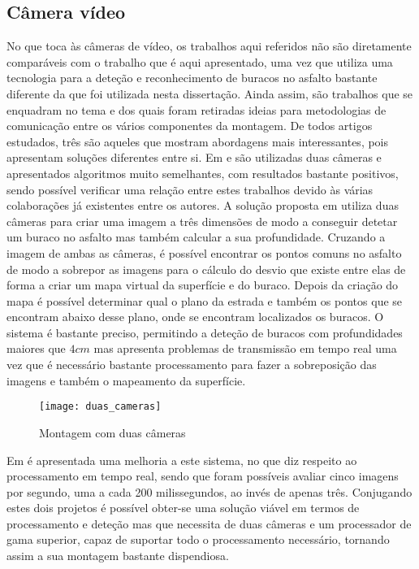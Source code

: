 \subsection{Câmera vídeo}
\label{subsec: camera_video}
No que toca às câmeras de vídeo, os trabalhos aqui referidos não são diretamente comparáveis com o trabalho que é aqui apresentado, uma vez que utiliza uma tecnologia para a deteção e reconhecimento de buracos no asfalto bastante diferente da que foi utilizada nesta dissertação.
Ainda assim, são trabalhos que se enquadram no tema e dos quais foram retiradas ideias para metodologias de comunicação entre os vários componentes da montagem.
De todos artigos estudados, três são aqueles que mostram abordagens mais interessantes, pois apresentam soluções diferentes entre si.
Em \cite{Zhang} e \cite{Chan2014} são utilizadas duas câmeras e apresentados algoritmos muito semelhantes, com resultados bastante positivos, sendo possível verificar uma relação entre estes trabalhos devido às várias colaborações já existentes entre os autores.
A solução proposta em \cite{Zhang} utiliza duas câmeras para criar uma imagem a três dimensões de modo a conseguir detetar um buraco no asfalto mas também calcular a sua profundidade.
Cruzando a imagem de ambas as câmeras, é possível encontrar os pontos comuns no asfalto de modo a sobrepor as imagens para o cálculo do desvio que existe entre elas de forma a criar um mapa virtual da superfície e do buraco.
Depois da criação do mapa é possível determinar qual o plano da estrada e também os pontos que se encontram abaixo desse plano, onde se encontram localizados os buracos.
O sistema é bastante preciso, permitindo a deteção de buracos com profundidades maiores que $4 cm$ mas apresenta problemas de transmissão em tempo real uma vez que é necessário bastante processamento para fazer a sobreposição das imagens e também o mapeamento da superfície.

\begin{figure}[htbp]
	\centering
	\texttt{[image: duas\_cameras]}
	\caption[Montagem com duas câmeras]{Montagem com duas câmeras \footnotemark}
	\label{fig:montagem_com_duas_cameras}
\end{figure}


Em \cite{Chan2014} é apresentada uma melhoria a este sistema, no que diz respeito ao processamento em tempo real, sendo que foram possíveis avaliar cinco imagens por segundo, uma a cada 200 milissegundos, ao invés de apenas três.
Conjugando estes dois projetos é possível obter-se uma solução viável em termos de processamento e deteção mas que necessita de duas câmeras e um processador de gama superior, capaz de suportar todo o processamento necessário, tornando assim a sua montagem bastante dispendiosa.

